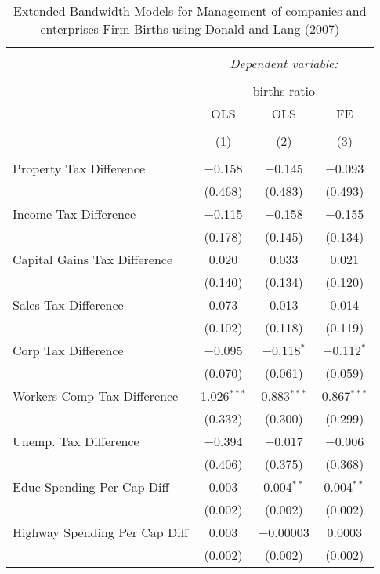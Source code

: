 
\begin{table}[!htbp] \centering 
  \caption{Extended Bandwidth Models for  Management of companies and enterprises Firm Births using Donald and Lang (2007)} 
  \label{} 
\begin{tabular}{@{\extracolsep{5pt}}lccc} 
\\[-1.8ex]\hline 
\hline \\[-1.8ex] 
 & \multicolumn{3}{c}{\textit{Dependent variable:}} \\ 
\cline{2-4} 
\\[-1.8ex] & \multicolumn{3}{c}{births ratio} \\ 
 & OLS & OLS & FE \\ 
\\[-1.8ex] & (1) & (2) & (3)\\ 
\hline \\[-1.8ex] 
 Property Tax Difference & $-$0.158 & $-$0.145 & $-$0.093 \\ 
  & (0.468) & (0.483) & (0.493) \\ 
  Income Tax Difference & $-$0.115 & $-$0.158 & $-$0.155 \\ 
  & (0.178) & (0.145) & (0.134) \\ 
  Capital Gains Tax Difference & 0.020 & 0.033 & 0.021 \\ 
  & (0.140) & (0.134) & (0.120) \\ 
  Sales Tax Difference & 0.073 & 0.013 & 0.014 \\ 
  & (0.102) & (0.118) & (0.119) \\ 
  Corp Tax Difference & $-$0.095 & $-$0.118$^{*}$ & $-$0.112$^{*}$ \\ 
  & (0.070) & (0.061) & (0.059) \\ 
  Workers Comp Tax Difference & 1.026$^{***}$ & 0.883$^{***}$ & 0.867$^{***}$ \\ 
  & (0.332) & (0.300) & (0.299) \\ 
  Unemp. Tax Difference & $-$0.394 & $-$0.017 & $-$0.006 \\ 
  & (0.406) & (0.375) & (0.368) \\ 
  Educ Spending Per Cap Diff & 0.003 & 0.004$^{**}$ & 0.004$^{**}$ \\ 
  & (0.002) & (0.002) & (0.002) \\ 
  Highway Spending Per Cap Diff & 0.003 & $-$0.00003 & 0.0003 \\ 
  & (0.002) & (0.002) & (0.002) \\ 

\end{tabular}
\end{table}
